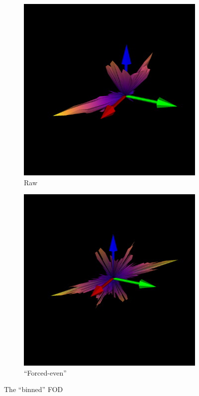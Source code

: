 \documentclass{article}
\begin{document}
\begin{figure}[h]
  \centering
  \begin{subfigure}[n]{0.48\textwidth}
    \centering
    \includegraphics[width=0.8\linewidth]{../odf_comparison/raw_odf}
    \caption{Raw}
  \end{subfigure}
  \hspace{0.5em}
  \begin{subfigure}[n]{0.48\textwidth}
    \centering
    \includegraphics[width=0.8\linewidth]{../odf_comparison/raw_odf_even}
    \caption{``Forced-even''}
  \end{subfigure}
  \caption{The ``binned'' FOD}
  \label{fig:raw_fods}
\end{figure}


  
\end{document}

